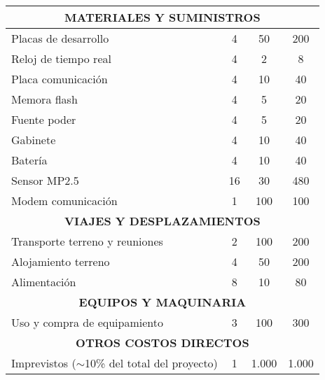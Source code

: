 \begin{table}[htpb]
\begin{tabularx}{\linewidth}{@{}|X|c|r|r|@{}}
\multicolumn{4}{|c|}{\textbf{MATERIALES Y SUMINISTROS}}\\ \hline
Placas de desarrollo 	& \multicolumn{1}{c|}{	4	} & \multicolumn{1}{c|}{	50	} &  \multicolumn{1}{c|}{	200	} \\ \hline
Reloj de tiempo real 	& \multicolumn{1}{c|}{	4	} & \multicolumn{1}{c|}{	2	} &  \multicolumn{1}{c|}{	8	} \\ \hline
Placa comunicación		& \multicolumn{1}{c|}{	4	} & \multicolumn{1}{c|}{	10	} &  \multicolumn{1}{c|}{	40	} \\ \hline
Memora flash			& \multicolumn{1}{c|}{	4	} & \multicolumn{1}{c|}{	5	} &  \multicolumn{1}{c|}{	20	} \\ \hline
Fuente poder			& \multicolumn{1}{c|}{	4	} & \multicolumn{1}{c|}{	5	} &  \multicolumn{1}{c|}{	20	} \\ \hline
Gabinete				& \multicolumn{1}{c|}{	4	} & \multicolumn{1}{c|}{	10	} &  \multicolumn{1}{c|}{	40	} \\ \hline
Batería					& \multicolumn{1}{c|}{	4	} & \multicolumn{1}{c|}{	10	} &  \multicolumn{1}{c|}{	40	} \\ \hline
Sensor MP2.5			& \multicolumn{1}{c|}{	16	} & \multicolumn{1}{c|}{	30	} &  \multicolumn{1}{c|}{	480	} \\ \hline
Modem comunicación		& \multicolumn{1}{c|}{	1	} & \multicolumn{1}{c|}{	100	} &  \multicolumn{1}{c|}{	100	} \\ \hline


\multicolumn{4}{|c|}{\textbf{VIAJES Y DESPLAZAMIENTOS}}\\ \hline
Transporte terreno y reuniones	& \multicolumn{1}{c|}{	2	} & \multicolumn{1}{c|}{	100	} &  \multicolumn{1}{c|}{	200	} \\ \hline
Alojamiento terreno 			& \multicolumn{1}{c|}{	4	} & \multicolumn{1}{c|}{	50	} &  \multicolumn{1}{c|}{	200	} \\ \hline
Alimentación					& \multicolumn{1}{c|}{	8	} & \multicolumn{1}{c|}{	10	} &  \multicolumn{1}{c|}{	80	} \\ \hline

\multicolumn{4}{|c|}{\textbf{EQUIPOS Y MAQUINARIA}}\\ \hline
Uso y compra de equipamiento& \multicolumn{1}{c|}{	3	} & \multicolumn{1}{c|}{	100	} &  \multicolumn{1}{c|}{	300	} \\ \hline

\multicolumn{4}{|c|}{\textbf{OTROS COSTOS DIRECTOS}}\\ \hline
Imprevistos	($\sim$10\% del total del  proyecto)				& \multicolumn{1}{c|}{	1	} & \multicolumn{1}{c|}{	1.000	} &  \multicolumn{1}{c|}{	1.000	} \\ \hline


\end{tabularx}
\end{table}
